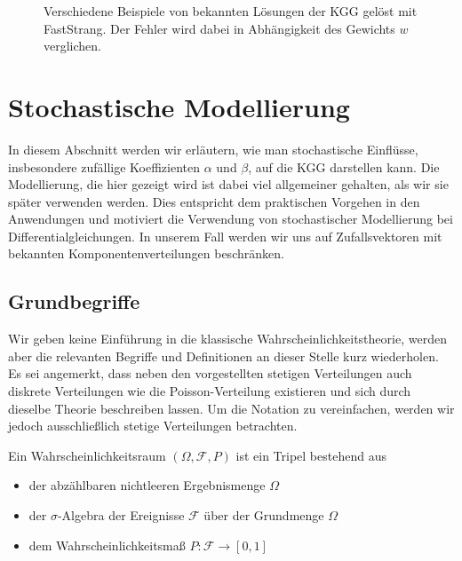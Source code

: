\begin{mathbsp}
\begin{figure}[!htb]
\caption{Verschiedene Beispiele von bekannten Lösungen der KGG gelöst mit FastStrang. Der Fehler wird dabei in Abhängigkeit des Gewichts $w$ verglichen.}
\label{fig:splitting_dependence_on_weight}
\end{figure}
\end{mathbsp}

\section{Stochastische Modellierung}
In diesem Abschnitt werden wir erläutern, wie man stochastische Einflüsse, insbesondere zufällige Koeffizienten $\alpha$ und $\beta$, auf die KGG darstellen kann. Die Modellierung, die hier gezeigt wird ist dabei viel allgemeiner gehalten, als wir sie später verwenden werden. Dies entspricht dem praktischen Vorgehen in den Anwendungen und motiviert die Verwendung von stochastischer Modellierung bei Differentialgleichungen. In unserem Fall werden wir uns auf Zufallsvektoren mit bekannten Komponentenverteilungen beschränken.
\subsection{Grundbegriffe}
Wir geben keine Einführung in die klassische Wahrscheinlichkeitstheorie, werden aber die relevanten Begriffe und Definitionen an dieser Stelle kurz wiederholen. Es sei angemerkt, dass neben den vorgestellten stetigen Verteilungen auch diskrete Verteilungen wie die Poisson-Verteilung existieren und sich durch dieselbe Theorie beschreiben lassen. Um die Notation zu vereinfachen, werden wir jedoch ausschließlich stetige Verteilungen betrachten.

\begin{mathdef}[Wahrscheinlichkeitsraum]
Ein Wahrscheinlichkeitsraum $(\Omega,\mathcal{F},P)$ ist ein Tripel bestehend aus 
\begin{itemize}
\item der abzählbaren nichtleeren Ergebnismenge $\Omega$
\item der $\sigma$-Algebra der Ereignisse $\mathcal{F}$ über der Grundmenge $\Omega$
\item dem Wahrscheinlichkeitsmaß $P\colon\mathcal{F}\to [0,1]$
\end{itemize}
\end{mathdef}

